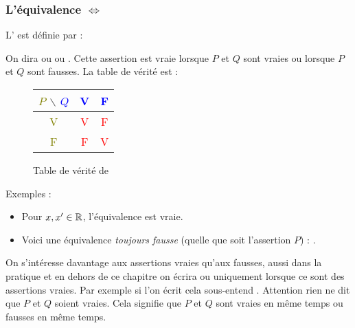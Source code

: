 \documentclass[11pt,class=report,crop=false]{standalone}
\begin{document}
\subsubsection*{L'équivalence $\iff$}


L' est définie par :

On dira  ou 
ou . Cette assertion est vraie
lorsque $P$ et $Q$ sont vraies ou lorsque $P$ et $Q$ sont fausses.
La table de vérité est :
\begin{figure}[H]
\centering
\begin{tabular}{c|c|c}
\textcolor{olive}{$P$} $\backslash$ \textcolor{blue}{$Q$}  & \textcolor{blue}{V} & \textcolor{blue}{F} \\ \hline
\textcolor{olive}{V} & \textcolor{red}{V} & \textcolor{red}{F} \\ \hline
\textcolor{olive}{F} & \textcolor{red}{F} & \textcolor{red}{V} \\
\end{tabular}
\caption{Table de vérité de }
\end{figure}

Exemples :
\begin{itemize}
  \item Pour $x,x' \in \mathbb{R}$, l'équivalence  est vraie.
  \item Voici une équivalence \emph{toujours fausse} (quelle que soit l'assertion $P$) :
.
\end{itemize}

On s'intéresse davantage aux assertions vraies qu'aux fausses, aussi dans la pratique
et en dehors de ce chapitre on écrira   ou 
uniquement lorsque ce sont des assertions vraies. Par exemple si l'on écrit
  cela sous-entend .
Attention rien ne dit que $P$ et $Q$ soient vraies. Cela signifie que $P$ et $Q$ sont vraies en même
temps ou fausses en même temps.
\end{document}
